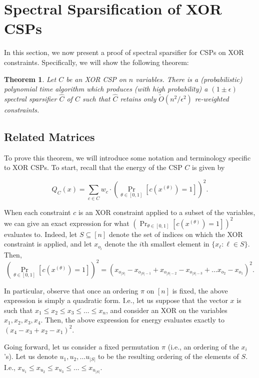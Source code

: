 \documentclass[11pt]{article}
\newtheorem{theorem}{Theorem}[section]
\theoremstyle{definition}
\newcommand{\eps}{\epsilon}
\begin{document}
\section{Spectral Sparsification of XOR CSPs}\label{sec:XORproof}

In this section, we now present a proof of spectral sparsifier for CSPs on XOR constraints. Specifically, we will show the following theorem:

\begin{theorem}\label{thm:XORmain}
    Let $C$ be an XOR CSP on $n$ variables. There is a (probabilistic) polynomial time algorithm which produces (with high probability) a $(1 \pm \eps)$ spectral sparsifier $\hat{C}$ of $C$ such that $\hat{C}$ retains only $\widetilde{O}(n^2 / \eps^2)$ re-weighted constraints.
\end{theorem}

\subsection{Related Matrices}

To prove this theorem, we will introduce some notation and terminology specific to XOR CSPs. To start, recall that the energy of the CSP $C$ is given by 

\[
    Q_C(x) = \sum_{c \in C} w_c \cdot \left(\Pr_{\theta \in [0,1]}[c(x^{(\theta)}) = 1] \right)^2.
\]

When each constraint $c$ is an XOR constraint applied to a subset of the variables, we can give an exact expression for what $\left(\Pr_{\theta \in [0,1]}[c(x^{(\theta)}) = 1] \right)^2$ evaluates to. Indeed, let $S \subseteq [n]$ denote the set of indices on which the XOR constraint is applied, and let $x_{o_{i}}$ denote the $i$th smallest element in $\{x_{\ell}: \ell \in S\}$. Then,
\[
\left(\Pr_{\theta \in [0,1]}[c(x^{(\theta)}) = 1] \right)^2 = (x_{o_{|S|}} - x_{o_{|S|-1}} + x_{o_{|S|-2}} - x_{o_{|S|-3}} + \dots x_{o_2} - x_{o_1})^2.
\]

In particular, observe that once an ordering $\pi$ on $[n]$ is fixed, the above expression is simply a quadratic form. I.e., let us suppose that the vector $x$ is such that $x_1 \leq x_2 \leq x_3 \leq \dots \leq x_n$, and consider an XOR on the variables $x_1, x_2, x_3, x_4$. Then, the above expression for energy evaluates exactly to $(x_4 - x_3 + x_2 - x_1)^2$.

Going forward, let us consider a fixed permutation $\pi$ (i.e., an ordering of the $x_i$'s). Let us denote $u_1, u_2, \dots u_{|S|}$ to be the resulting ordering of the elements of $S$. I.e., $x_{u_1} \leq x_{u_2} \leq x_{u_3} \leq \dots \leq x_{u_{|S|}}$.
\end{document}
